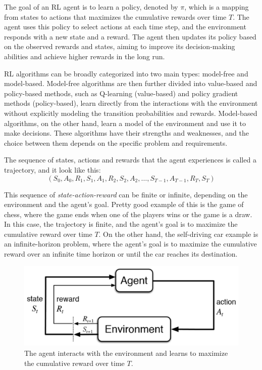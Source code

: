\documentclass[../xlapes02]{subfiles}
\begin{document}
    The goal of an RL agent is to learn a policy, denoted by $\pi$, which is a mapping from states to actions that maximizes the cumulative rewards over time $T$.
    The agent uses this policy to select actions at each time step, and the environment responds with a new state and a reward.
    The agent then updates its policy based on the observed rewards and states, aiming to improve its decision-making abilities and achieve higher rewards in the long run.

    RL algorithms can be broadly categorized into two main types: model-free and model-based.
    Model-free algorithms are then further divided into value-based and policy-based methods, such as Q-learning (value-based) and policy gradient methods (policy-based), learn directly from the interactions with the environment without explicitly modeling the transition probabilities and rewards.
    Model-based algorithms, on the other hand, learn a model of the environment and use it to make decisions.
    These algorithms have their strengths and weaknesses, and the choice between them depends on the specific problem and requirements.

    The sequence of states, actions and rewards that the agent experiences is called a trajectory, and it look like this:
    \begin{equation}
        \label{eq:trajectory}
        (S_0, A_0, R_1, S_1, A_1, R_2, S_2, A_2, \dots, S_{T-1}, A_{T-1}, R_T, S_T)
    \end{equation}

    This sequence of \emph{state-action-reward} can be finite or infinite, depending on the environment and the agent's goal.
    Pretty good example of this is the game of chess, where the game ends when one of the players wins or the game is a draw.
    In this case, the trajectory is finite, and the agent's goal is to maximize the cumulative reward over time $T$.
    On the other hand, the self-driving car example is an infinite-horizon problem, where the agent's goal is to maximize the cumulative reward over an infinite time horizon or until the car reaches its destination.

    \begin{figure}[h]
        \includegraphics[width=0.6\linewidth]{image/agent-environment}
        \centering
        \caption{The agent interacts with the environment and learns to maximize the cumulative reward over time $T$.}
        \label{fig:rl-introduction}
    \end{figure}
\end{document}
